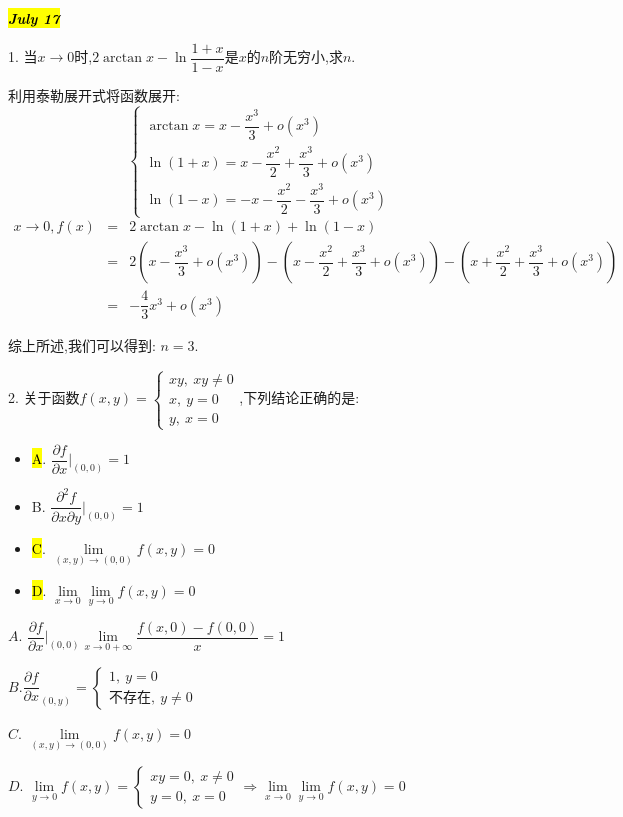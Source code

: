 \hl{\textbf{\textit{July 17}}}

1. 当$x\rightarrow 0$时,$2\arctan x-\ln\dfrac{1+x}{1-x}$是$x$的$n$阶无穷小,求$n$.
\begin{solution}
	
	利用泰勒展开式将函数展开: 
	$$\left\lbrace
	\begin{array}{l}
		\arctan x=x-\dfrac{x^3}{3}+o(x^3)\\
		\ln(1+x)=x-\dfrac{x^2}{2}+\dfrac{x^3}{3}+o(x^3)\\
		\ln(1-x)=-x-\dfrac{x^2}{2}-\dfrac{x^3}{3}+o(x^3)
	\end{array}
	\right. $$
	\begin{eqnarray*}
		x\rightarrow 0, f(x)&=&2\arctan x-\ln(1+x)+\ln(1-x)\\
		&=&2(x-\dfrac{x^3}{3}+o(x^3))-(x-\dfrac{x^2}{2}+\dfrac{x^3}{3}+o(x^3))-(x+\dfrac{x^2}{2}+\dfrac{x^3}{3}+o(x^3))\\
		&=&-\dfrac{4}{3}x^3+o(x^3)
	\end{eqnarray*}
	
	综上所述,我们可以得到: $n=3$.
\end{solution}

2. 关于函数$f(x,y)=\left\lbrace
\begin{array}{l}
	xy,\ xy\neq 0\\x,\ y=0\\y,\ x=0
\end{array}
\right. $,下列结论正确的是: 
\begin{itemize}
	\item \hl{A}. $\dfrac{\partial f}{\partial x}|_{(0,0)}=1$
	\item B. $\dfrac{\partial^2 f}{\partial x\partial y}|_{(0,0)}=1$
	\item \hl{C}. $\lim\limits_{(x,y)\rightarrow (0,0)}f(x,y)=0$
	\item \hl{D}. $\lim\limits_{x\rightarrow 0}\lim\limits_{y\rightarrow 0}f(x,y)=0$
\end{itemize}
\begin{solution}
	
	$A$. $\dfrac{\partial f}{\partial x}|_{(0,0)}\lim\limits_{x\rightarrow 0 +\infty}\dfrac{f(x,0)-f(0,0)}{x}=1$
	
	$B$.$\dfrac{\partial f}{\partial x}_{(0,y)}=\left\lbrace
	\begin{array}{l}
		1,\ y=0\\ \text{不存在},\ y\neq 0 
	\end{array}
	\right. $
	
	$C$. $\lim\limits_{(x,y)\rightarrow (0,0)}f(x,y)=0$
	
	$D$. $\lim\limits_{y\rightarrow 0}f(x,y)=\left\lbrace
	\begin{array}{l}
		xy=0,\ x\neq 0\\y=0,\ x=0
	\end{array}
	\right.\Rightarrow  \lim\limits_{x\rightarrow 0}\lim\limits_{y\rightarrow 0}f(x,y)=0$
\end{solution}

